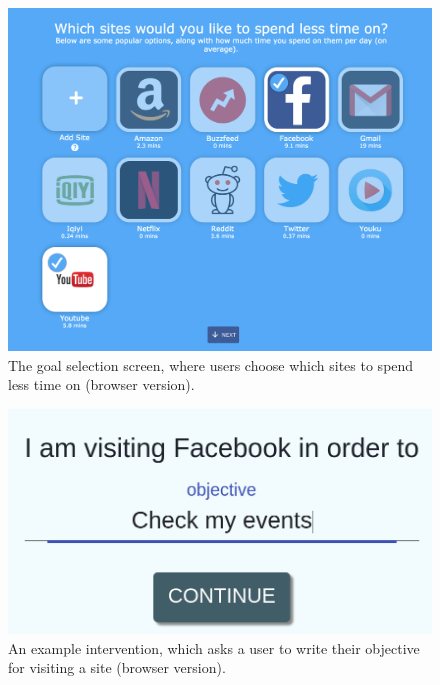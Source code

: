 
\begin{figure}
\includegraphics[width=\linewidth]{figures2/chrome-goal-selection}
\caption{The goal selection screen, where users choose which sites to spend less time on (browser version). %
}
  \label{fig:chrome-goal-selection}
\end{figure}

\begin{figure}
\includegraphics[width=\linewidth]{figures2/chrome-intervention-v3}
\caption{An example intervention, which asks a user to write their objective for visiting a site (browser version). %
}
  \label{fig:chrome-intervention}
\end{figure}

